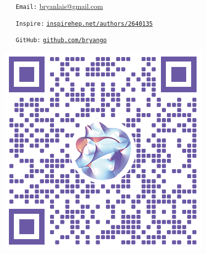 \documentclass[10pt]{article}
\begin{document}
\begin{multicols}{3}
\hspace{-.7em}
\begin{minipage}[c]{.81\linewidth}
\begin{itemize}[noitemsep,leftmargin=5em]\small
\item[\texttt{Email:}]
	\url{bryanlais@gmail.com}
\item[\texttt{Inspire:}]
	\href{https://inspirehep.net/authors/2640135}{
		\texttt{inspirehep.net/authors/2640135}
	}
\item[\texttt{GitHub:}]
	\href{https://github.com/bryango}{
		\texttt{github.com/bryango}
	}
\end{itemize}
\end{minipage}%
\hfill%
\begin{minipage}{.17\linewidth}
\includegraphics[width=\linewidth]{img/inspire-qr.png}
\end{minipage}%
~\mbox{}

\end{multicols}
\end{document}
